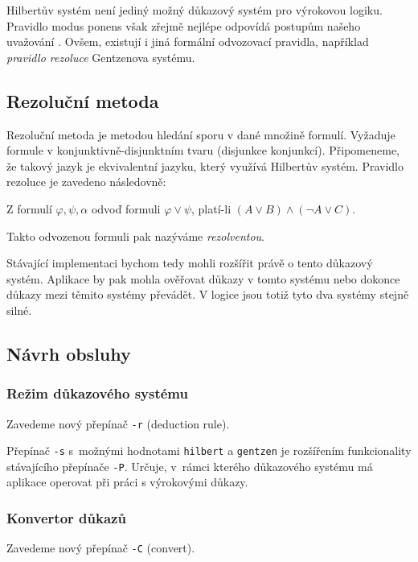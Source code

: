 \documentclass[thesis=B,czech,hidelinks]{thesis}[2012/06/26]
\begin{document}
Hilbertův systém není jediný možný důkazový systém pro výrokovou logiku. Pravidlo modus ponens však zřejmě nejlépe odpovídá postupům našeho uvažování \cite{sochor}. Ovšem, existují i jiná formální odvozovací pravidla, například \emph{pravidlo rezoluce} Gentzenova systému.

\subsection{Rezoluční metoda}

Rezoluční metoda je metodou hledání sporu v dané množině formulí. Vyžaduje formule v konjunktivně-disjunktním tvaru (disjunkce konjunkcí). Připomeneme, že takový jazyk je ekvivalentní jazyku, který využívá Hilbertův systém. Pravidlo rezoluce je zavedeno následovně:

\begin{dfn}
Z formulí $\varphi , \psi , \alpha$ odvoď formuli $\varphi
 \vee \psi$, platí-li $(A \vee B) \wedge ( \neg A \vee C )$.
\end{dfn}

Takto odvozenou formuli pak nazýváme \emph{rezolventou}.

Stávající implementaci bychom tedy mohli rozšířit právě o tento důkazový systém. Aplikace by pak mohla ověřovat důkazy v tomto systému nebo dokonce důkazy mezi těmito systémy převádět. V logice jsou totiž tyto dva systémy stejně silné.

\subsection{Návrh obsluhy}

\subsubsection{Režim důkazového systému}

Zavedeme nový přepínač \texttt{-r} (deduction rule).

Přepínač \texttt{-s} s~možnými hodnotami \texttt{hilbert} a \texttt{gentzen} je rozšířením funkcionality stávajícího přepínače \texttt{-P}. Určuje, v~rámci kterého důkazového systému má aplikace operovat při práci s výrokovými důkazy.

\subsubsection{Konvertor důkazů}

Zavedeme nový přepínač \texttt{-C} (convert).
\end{document}

